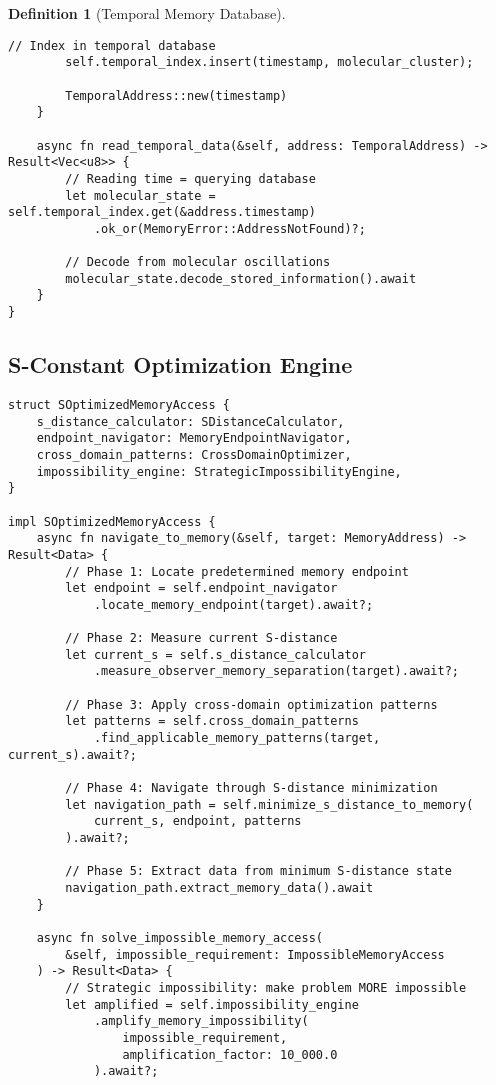 \documentclass[12pt]{article}
\newtheorem{definition}[theorem]{Definition}
\begin{document}
\begin{definition}[Temporal Memory Database]
\begin{lstlisting}[caption=Temporal Database Implementation]
        // Index in temporal database
        self.temporal_index.insert(timestamp, molecular_cluster);
        
        TemporalAddress::new(timestamp)
    }
    
    async fn read_temporal_data(&self, address: TemporalAddress) -> Result<Vec<u8>> {
        // Reading time = querying database
        let molecular_state = self.temporal_index.get(&address.timestamp)
            .ok_or(MemoryError::AddressNotFound)?;
            
        // Decode from molecular oscillations
        molecular_state.decode_stored_information().await
    }
}
\end{lstlisting}

\subsection{S-Constant Optimization Engine}

\begin{lstlisting}[caption=S-Constant Memory Optimization]
struct SOptimizedMemoryAccess {
    s_distance_calculator: SDistanceCalculator,
    endpoint_navigator: MemoryEndpointNavigator,
    cross_domain_patterns: CrossDomainOptimizer,
    impossibility_engine: StrategicImpossibilityEngine,
}

impl SOptimizedMemoryAccess {
    async fn navigate_to_memory(&self, target: MemoryAddress) -> Result<Data> {
        // Phase 1: Locate predetermined memory endpoint
        let endpoint = self.endpoint_navigator
            .locate_memory_endpoint(target).await?;
        
        // Phase 2: Measure current S-distance  
        let current_s = self.s_distance_calculator
            .measure_observer_memory_separation(target).await?;
        
        // Phase 3: Apply cross-domain optimization patterns
        let patterns = self.cross_domain_patterns
            .find_applicable_memory_patterns(target, current_s).await?;
        
        // Phase 4: Navigate through S-distance minimization
        let navigation_path = self.minimize_s_distance_to_memory(
            current_s, endpoint, patterns
        ).await?;
        
        // Phase 5: Extract data from minimum S-distance state
        navigation_path.extract_memory_data().await
    }
    
    async fn solve_impossible_memory_access(
        &self, impossible_requirement: ImpossibleMemoryAccess
    ) -> Result<Data> {
        // Strategic impossibility: make problem MORE impossible  
        let amplified = self.impossibility_engine
            .amplify_memory_impossibility(
                impossible_requirement, 
                amplification_factor: 10_000.0
            ).await?;
        

\end{lstlisting}
\end{definition}
\end{document}
